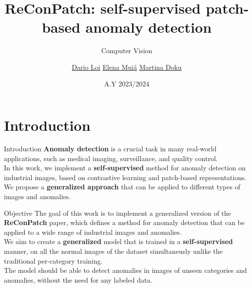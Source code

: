 \documentclass{beamer}
\title{ReConPatch: self-supervised patch-based anomaly detection}
\subtitle{Computer Vision}
\author{\href{mailto:loi.1940849@studenti.uniroma1.it}{Dario Loi} \hspace{1em} \href{mailto:muia.1938610@studenti.uniroma1.it}{Elena Muiá} \hspace{1em} \href{mailto:doku.1938629@studenti.uniroma1.it}{Martina Doku}\\}
\date{A.Y 2023/2024}
\begin{document}
\maketitle

\section{Introduction}
\begin{frame}{Introduction}
      \textbf{Anomaly detection} is a crucial task in many real-world applications,
       such as medical imaging, surveillance, and quality control.\\ 

        In this work, we implement a \textbf{self-supervised} method for anomaly detection
         on industrial images, based on contrastive learning and patch-based
          representations.\\

          We propose a \textbf{generalized approach} that can be applied
           to different types of images and anomalies.
          
\end{frame}
\begin{frame}{Objective}
      The goal of this work is to implement a generalized version of the \textbf{ReConPatch} \cite{reconpatch} paper, 
      which defines
       a method for anomaly detection that can be applied to a wide range of industrial images and anomalies.\\

        We aim to create a \textbf{generalized} model that is 
        trained in a \textbf{self-supervised} manner, on all the normal images of the
         dataset simultaneusly unlike the traditional per-category training.\\

          The model should be able to detect anomalies in images of unseen categories
           and anomalies, without the need for any labeled data.
\end{frame}
\end{document}
